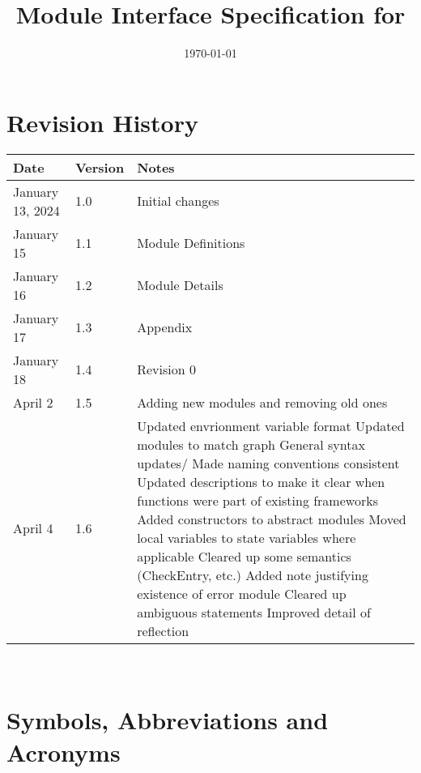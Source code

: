 \documentclass[12pt, titlepage]{article}
\begin{document}
\title{Module Interface Specification for \progname{}}

\author{\authname}

\date{\today}

\maketitle


\section{Revision History}

\begin{tabularx}{\textwidth}{p{3cm}p{2cm}X}
\toprule {\bf Date} & {\bf Version} & {\bf Notes}\\
\midrule
January 13, 2024 & 1.0 & Initial changes\\
January 15 & 1.1 & Module Definitions\\
January 16 & 1.2 & Module Details\\
January 17 & 1.3 & Appendix\\
January 18 & 1.4 & Revision 0\\
April 2 & 1.5 & Adding new modules and removing old ones\\
April 4 & 1.6 & Updated envrionment variable format
\newline Updated modules to match graph
\newline General syntax updates/ Made naming conventions consistent
\newline Updated descriptions to make it clear when functions were part of existing frameworks
\newline Added constructors to abstract modules
\newline Moved local variables to state variables where applicable
\newline Cleared up some semantics (CheckEntry, etc.)
\newline Added note justifying existence of error module
\newline Cleared up ambiguous statements
\newline Improved detail of reflection\\
\bottomrule
\end{tabularx}

~\newpage

\section{Symbols, Abbreviations and Acronyms}
\end{document}
